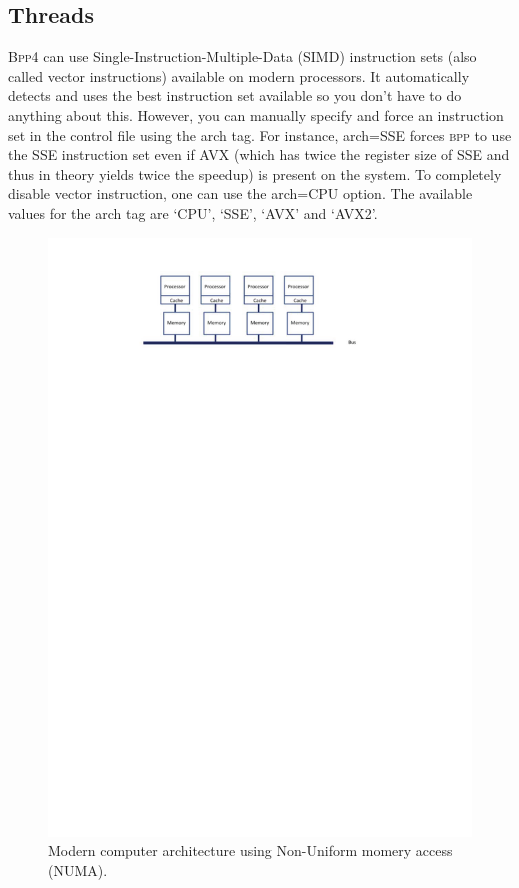 \documentclass{book}
\numberwithin{equation}{section} \renewcommand{\baselinestretch}{0.55}
\begin{document}
\subsection{Threads}

\textsc{Bpp4} can use Single-Instruction-Multiple-Data (SIMD)
instruction sets (also called vector instructions) available on modern
processors.  It automatically detects and uses the best instruction
set available so you don’t have to do anything about this.  However,
you can manually specify and force an instruction set in the control
file using the arch tag.  For instance, arch=SSE forces \textsc{bpp}
to use the SSE instruction set even if AVX (which has twice the
register size of SSE and thus in theory yields twice the speedup) is
present on the system. To completely disable vector instruction, one
can use the arch=CPU option.  The available values for the arch tag
are ‘CPU’, ‘SSE’, ‘AVX’ and ‘AVX2’.

\begin{figure} [t]
  \centering \includegraphics[scale=0.7890]{figures/fig-numa}

  \caption{Modern computer architecture using Non-Uniform momery
    access (NUMA).  }  \label{fig-numa}
\end{figure}
\end{document}
